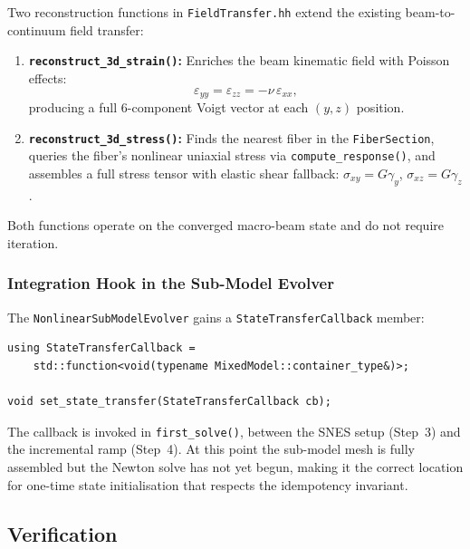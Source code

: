 Two reconstruction functions in \texttt{FieldTransfer.hh} extend the
existing beam-to-continuum field transfer:

\begin{enumerate}
  \item \textbf{\texttt{reconstruct\_3d\_strain()}:}  Enriches the
    beam kinematic field with Poisson effects:
    \[
      \varepsilon_{yy} = \varepsilon_{zz} = -\nu\,\varepsilon_{xx},
    \]
    producing a full 6-component Voigt vector at each $(y,z)$ position.

  \item \textbf{\texttt{reconstruct\_3d\_stress()}:}  Finds the
    nearest fiber in the \texttt{FiberSection}, queries the fiber's
    nonlinear uniaxial stress via \texttt{compute\_response()}, and
    assembles a full stress tensor with elastic shear fallback:
    $\sigma_{xy} = G\gamma_y$, $\sigma_{xz} = G\gamma_z$.
\end{enumerate}

Both functions operate on the converged macro-beam state and do not
require iteration.

\subsubsection{Integration Hook in the Sub-Model Evolver}

The \texttt{NonlinearSubModelEvolver} gains a
\texttt{StateTransferCallback} member:

\begin{lstlisting}
using StateTransferCallback =
    std::function<void(typename MixedModel::container_type&)>;

void set_state_transfer(StateTransferCallback cb);
\end{lstlisting}

The callback is invoked in \texttt{first\_solve()}, between the SNES
setup (Step~3) and the incremental ramp (Step~4).  At this point the
sub-model mesh is fully assembled but the Newton solve has not yet
begun, making it the correct location for one-time state initialisation
that respects the idempotency invariant.


\subsection{Verification}
\label{ssec:state-injection-verification}

